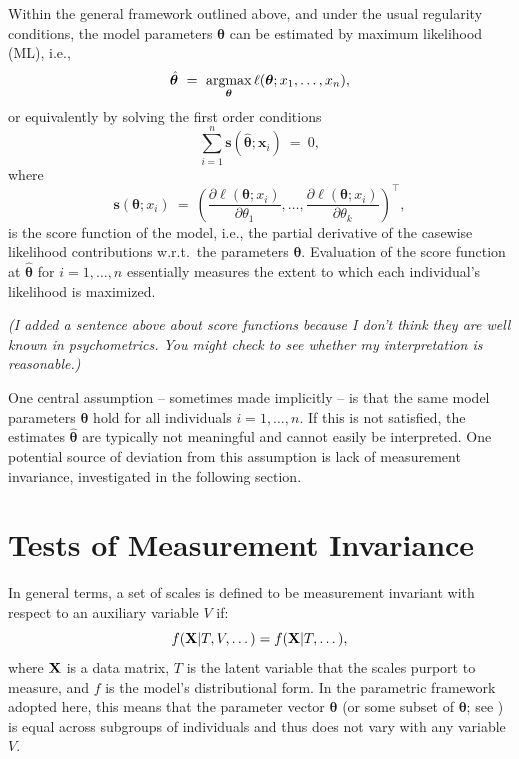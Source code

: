 \documentclass[man]{apa}
\newcommand{\argmax}{\operatorname{argmax}\displaylimits}
\newcommand{\readme}[1]{\emph{\marginpar{README} (#1)}}
\begin{document}
Within the general framework outlined above, and under the usual
regularity conditions, the model parameters $\bm{\theta}$ can
be estimated by maximum likelihood (ML), i.e.,
\begin{equation} \label{eq:ml}
  \hat{\bm{\theta}} ~=~ \argmax_{\bm{\theta}} \ell(\bm{\theta}; x_1, \dots, x_n),
\end{equation}
or equivalently by solving the first order conditions
\begin{equation}
    \label{eq:ml1}
  \sum_{i=1}^{n} {\bm s}(\hat{\bm{\theta}}; \bm{x}_i) ~=~ 0,    
\end{equation}
where 
\begin{equation}
  \label{eq:score}
  {\bm s}({\bm \theta}; x_i) ~=~ \left(
    \frac{\partial \ell({\bm \theta}; x_i)}{\partial \theta_1},
    \dots,
    \frac{\partial \ell({\bm \theta}; x_i)}{\partial \theta_k}
  \right)^\top,
\end{equation}
is the score function of the model, i.e., the partial derivative of the casewise
likelihood contributions w.r.t.\ the parameters $\bm{\theta}$.
Evaluation of the score function at $\hat{\bm{\theta}}$ for $i=1,
\dots, n$ essentially measures the extent to which each individual's
likelihood is maximized.

\readme{I added a sentence above about score functions because I don't think
  they are well known in psychometrics.  You might check to see whether my
  interpretation is reasonable.}
 
One central assumption -- sometimes made implicitly -- is that
the same model parameters $\bm{\theta}$ hold for all individuals $i = 1, \dots, n$.
If this is not satisfied, the estimates $\hat{\bm{\theta}}$ are typically
not meaningful and cannot easily be interpreted.
One potential source of deviation from this assumption is lack of
measurement invariance, investigated in the following section.



\section{Tests of Measurement Invariance}

In general terms, a set of scales is defined to be measurement
invariant with respect to an auxiliary variable $V$ if:
\begin{equation}
    \label{eq:midef}
      f({\bf X} | T, V, \dots) = f({\bf X} | T, \dots),
\end{equation}
where ${\bf X}$ is a data matrix, $T$ is the latent
variable that the scales purport to measure, and $f$ is the model's
distributional form.  In the parametric framework
adopted here, this means that the parameter vector ${\bm \theta}$ (or
some subset of ${\bm \theta}$; see ) is equal
across subgroups of individuals and thus does not vary
with any variable $V$.
\end{document}
